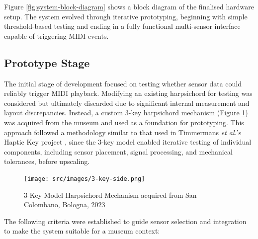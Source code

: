 Figure \ref{fig:system-block-diagram} shows a block diagram of the finalised hardware setup. The system evolved through iterative prototyping, beginning with simple threshold-based testing and ending in a fully functional multi-sensor interface capable of triggering MIDI events. 

\subsection{Prototype Stage}

The initial stage of development focused on testing whether sensor data could reliably trigger MIDI playback. Modifying an existing harpsichord for testing was considered but ultimately discarded due to significant internal measurement and layout discrepancies. Instead, a custom 3-key harpsichord mechanism (Figure \ref{fig:3key}) was acquired from the museum and used as a foundation for prototyping. This approach followed a methodology similar to that used in Timmermans \emph{et al.}'s Haptic Key project \cite{Timmermans2020}, since the 3-key model enabled iterative testing of individual components, including sensor placement, signal processing, and mechanical tolerances, before upscaling. 

\begin{figure}
    \centering
    \texttt{[image: src/images/3-key-side.png]}
    \caption{3-Key Model Harpsichord Mechanism acquired from San Colombano, Bologna, 2023}
    \label{fig:3key}
\end{figure}



The following criteria were established to guide sensor selection and integration to make the system suitable for a museum context:

